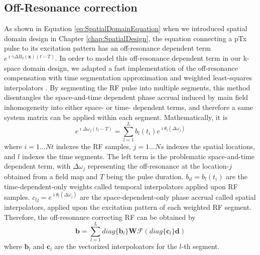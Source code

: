 \subsection*{ Off-Resonance correction}
\par As shown in Equation \ref{eq:SpatialDomainEquation} when we introduced spatial domain design in Chapter \ref{chap:SpatialDesign}, the equation connecting a pTx pulse to its excitation pattern has an off-resonance dependent term 
$e^{\imath \gamma \Delta B_0(\mathbf{x})(t-T)}$. In order to model this off-resonance dependent term in our k-space domain design, we adapted a fast implementation of the off-resonance compensation with time segmentation approximation and weighted least-squares interpolators \cite{fessler2005toeplitz}. 
By segmenting the RF pulse into multiple segments, this method disentangles the space-and-time dependent phase accrual induced by main field inhomogeneity into either space- or time- dependent terms, and therefore a same system matrix can be applied within each segment. Mathematically, it is
\begin{equation*}
e^{\imath \Delta\omega_j (t_i-T) }=\sum_{l=1}^{L} b_{l}(t_i) e^{\imath \theta_{l}(\Delta\omega_j)}
\end{equation*}
where $i=1\dots Nt$ indexes the RF samples, $j=1\dots Ns$ indexes the spatial locations, and $l$ indexes the time segments. The left term is the problematic space-and-time dependent term, with $\Delta\omega_j$ representing the off-resonance at the location-$j$ obtained from a field map and $T$ being the pulse duration. $b_{il}=b_{l}(t_i)$ are the time-dependent-only weights called temporal interpolators applied upon RF samples. $c_{lj}=e^{\imath \theta_{l}(\Delta\omega_j)}$ are the space-dependent-only phase accrual called spatial interpolators, applied upon the excitation pattern of each weighted RF segment. 
Therefore, the off-resonance correcting RF can be obtained by 
\begin{equation*}
\mathbf{b}=\sum_{l=1}^{L}diag\{\mathbf{b}_l\}\mathbf{W}\mathcal{F}(diag\{\mathbf{c}_l\}\mathbf{d})
\end{equation*}
where $\mathbf{b}_l$ and $\mathbf{c}_l$ are the vectorized interpoloators for the $l$-th segment. 

